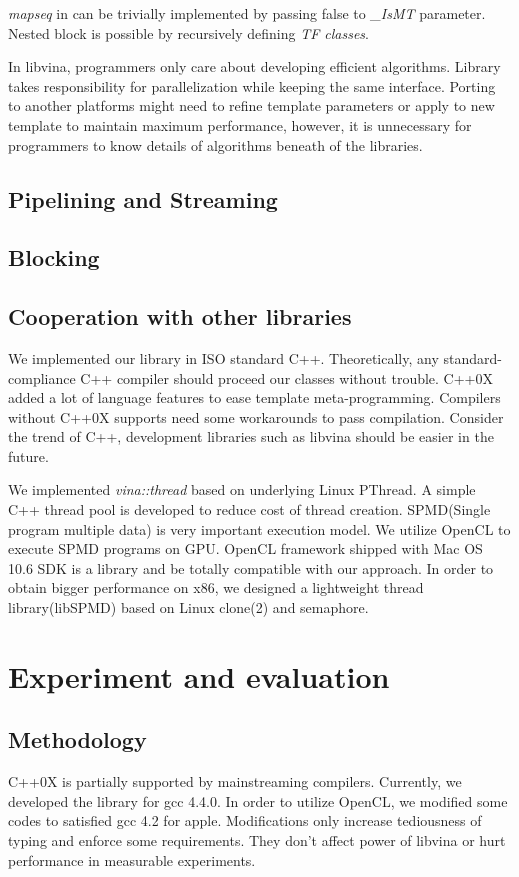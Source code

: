 \documentclass[10pt, conference, compsocconf]{IEEEtran}
\begin{document}
\emph{mapseq} in \cite{b1} can be trivially implemented by passing false to \emph{\_IsMT} parameter. Nested block is possible by recursively defining \emph{TF classes}.

In libvina, programmers only care about developing efficient algorithms. Library takes responsibility for parallelization while keeping the same interface. Porting to another platforms might need to refine template parameters or apply to new template to maintain maximum performance, however, it is unnecessary for programmers to know details of algorithms beneath of the libraries.
\subsection{Pipelining and Streaming}
\subsection{Blocking}
\subsection{Cooperation with other libraries}
We implemented our library in ISO standard C++. Theoretically, any standard-compliance C++ compiler should proceed our classes without trouble. C++0X \cite{b17} added a lot of language features to ease template meta-programming. Compilers without C++0X supports need some workarounds to pass compilation. Consider the trend of C++, development libraries such as libvina should be easier in the future. 

We implemented \emph{vina::thread} based on underlying Linux PThread. A simple C++ thread pool is developed to reduce cost of thread creation. SPMD(Single program multiple data) is very important execution model. We utilize OpenCL to execute SPMD programs on GPU. OpenCL framework shipped with Mac OS 10.6 SDK is a library and be totally compatible with our approach. In order to obtain bigger performance on x86, we designed a lightweight thread library(libSPMD) based on Linux clone(2) and semaphore.

\section{Experiment and evaluation}
\subsection{Methodology}
C++0X is partially supported by mainstreaming compilers. Currently, we developed the library for gcc 4.4.0. In order to utilize OpenCL, we modified some codes to satisfied gcc 4.2 for apple. Modifications only increase tediousness of typing and enforce some requirements. They don't affect power of libvina or hurt performance in measurable experiments.
\end{document}
